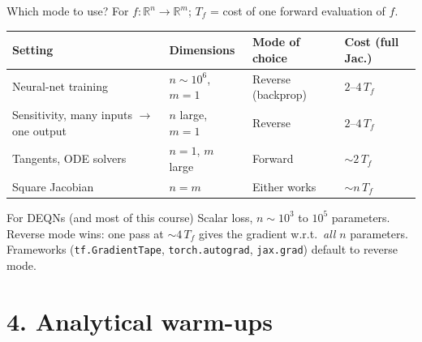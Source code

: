 \documentclass[aspectratio=169,11pt]{beamer}
\newcommand{\emphc}[1]{\textcolor{harvardcrimson}{#1}}
\newcommand{\R}{\mathbb{R}}
\begin{document}
\begin{frame}{Which mode to use?}
\footnotesize
For $f:\R^n \to \R^m$; $T_f$ = cost of one forward evaluation of $f$.
\vspace{2pt}
\begin{center}
\renewcommand{\arraystretch}{1.1}
\begin{tabular}{p{3.4cm} p{3.0cm} p{3.0cm} p{2.4cm}}
\toprule
\textbf{Setting} & \textbf{Dimensions} & \textbf{Mode of choice} & \textbf{Cost (full Jac.)} \\
\midrule
Neural-net training & $n\!\sim\!10^6$, $m\!=\!1$ & \emphc{Reverse} (backprop) & $2\text{--}4\,T_f$ \\
Sensitivity, many inputs $\to$ one output & $n$ large, $m\!=\!1$ & Reverse & $2\text{--}4\,T_f$ \\
Tangents, ODE solvers & $n\!=\!1$, $m$ large & \emphc{Forward} & $\sim 2\,T_f$ \\
Square Jacobian & $n = m$ & Either works & $\sim n\,T_f$ \\
\bottomrule
\end{tabular}
\end{center}
\vspace{2pt}
\begin{block}{For DEQNs (and most of this course)}
\footnotesize
Scalar loss, $n\sim 10^3$ to $10^5$ parameters. \emphc{Reverse mode wins}: one pass at $\sim 4\,T_f$ gives the gradient w.r.t.\ \emph{all} $n$ parameters. Frameworks (\texttt{tf.GradientTape}, \texttt{torch.autograd}, \texttt{jax.grad}) default to reverse mode.
\end{block}
\end{frame}


\section*{4. Analytical warm-ups}
\end{document}

